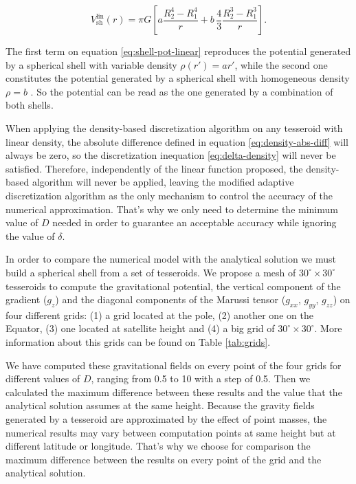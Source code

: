 \documentclass[extra]{gji}
\begin{document}
\begin{equation}
    V_\text{sh}^\text{lin}(r) = \pi G \left[ 
    a \frac{R_2^4 - R_1^4}{r} +
    b \,\frac{4}{3} \frac{R_2^3 - R_1^3}{r} \right].
    \label{eq:shell-pot-linear}
\end{equation}

\noindent The first term on equation \ref{eq:shell-pot-linear} 
reproduces the potential generated by a spherical shell with variable 
density $\rho(r') = ar'$, while the second one constitutes the 
potential generated by a spherical shell with homogeneous density $\rho 
= b$ \citep{Mikuska2006,Grombein2013}. So the potential can be read as 
the one generated by a combination of both shells.

When applying the density-based discretization algorithm on any 
tesseroid with linear density, the absolute difference defined in 
equation \ref{eq:density-abs-diff} will always be zero, so the 
discretization inequation \ref{eq:delta-density} will never be 
satisfied.
Therefore, independently of the linear function proposed, the 
density-based algorithm will never be applied, leaving the modified 
adaptive discretization algorithm as the only mechanism to control the 
accuracy of the numerical approximation.
That's why we only need to determine the minimum value of $D$ needed in 
order to guarantee an acceptable accuracy while ignoring the value of 
$\delta$.

In order to compare the numerical model with the analytical solution we 
must build a spherical shell from a set of tesseroids.
We propose a mesh of $30^\circ \times 30^\circ$ tesseroids to compute 
the gravitational potential, the vertical component of the gradient 
($g_z$) and the diagonal components of the Marussi tensor ($g_{xx}$, 
$g_{yy}$, $g_{zz}$) on four different grids: (1) a grid located at the 
pole, (2) another one on the Equator, (3) one located at satellite 
height and (4) a big grid of $30^\circ \times 30^\circ$.
More information about this grids can be found on Table 
\ref{tab:grids}.

We have computed these gravitational fields on every point of the four 
grids for different values of $D$, ranging from 0.5 to 10 with a step 
of 0.5.
Then we calculated the maximum difference between these results and the 
value that the analytical solution assumes at the same height.
Because the gravity fields generated by a tesseroid are approximated by 
the effect of point masses, the numerical results may vary between 
computation points at same height but at different latitude or 
longitude.
That's why we choose for comparison the maximum difference between the 
results on every point of the grid and the analytical solution.
\end{document}
